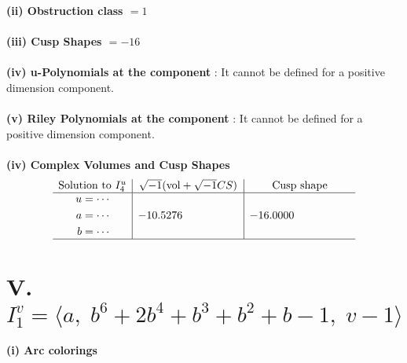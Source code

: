 \documentclass[1p]{elsarticle_modified}
\theoremstyle{definition}
\newcommand{\I}{\sqrt{-1}}
\begin{document}
\flushleft \textbf{(ii) Obstruction class $= 1$}\\~\\
\flushleft \textbf{(iii) Cusp Shapes $= -16$}\\~\\
\flushleft \textbf{(iv) u-Polynomials at the component} : It cannot be defined for a positive dimension component.\\~\\
\flushleft \textbf{(v) Riley Polynomials at the component} : It cannot be defined for a positive dimension component.\\~\\
\newpage\flushleft \textbf{(iv) Complex Volumes and Cusp Shapes}
$$\begin{array}{c|c|c} 
\text{Solution to }I^u_{4}& \I (\text{vol} + \sqrt{-1}CS) & \text{Cusp shape}\\
 \hline 
\begin{aligned}
u &= \cdots \\
a &= \cdots \\
b &= \cdots\end{aligned}
 & -10.5276\phantom{ +0.000000I} & -16.0000\phantom{ +0.000000I}\\
 \hline 
 \end{array}
$$\newpage\renewcommand{\arraystretch}{1}
\centering \section*{V. $I^v_{1}= \langle a,\;b^6+2 b^4+b^3+b^2+b-1,\;v-1 \rangle$}
\flushleft \textbf{(i) Arc colorings}\\
\end{document}
